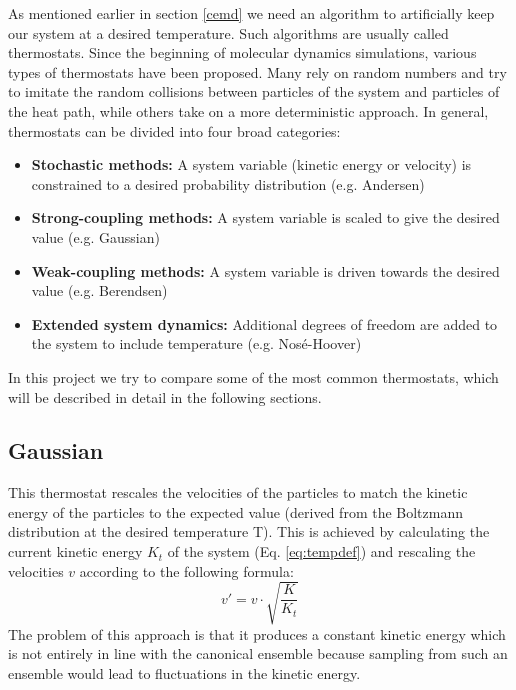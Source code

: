 As mentioned earlier in section \ref{cemd} we need an algorithm to artificially keep our system at a desired temperature. Such algorithms are usually called thermostats. Since the beginning of molecular dynamics simulations, various types of thermostats have been proposed. Many rely on random numbers and try to imitate the random collisions between particles of the system and particles of the heat path, while others take on a more deterministic approach. In general, thermostats can be divided into four broad categories: 
\begin{itemize}
\item \textbf{Stochastic methods:} A system variable (kinetic energy or velocity) is constrained to a desired probability distribution (e.g. Andersen)
\item \textbf{Strong-coupling methods:} A system variable is scaled to give the desired value (e.g. Gaussian) 
\item \textbf{Weak-coupling methods:} A system variable is driven towards the desired value (e.g. Berendsen) 
\item \textbf{Extended system dynamics:} Additional degrees of freedom are added to the system to include temperature (e.g. Nosé-Hoover) 
\end{itemize}  
In this project we try to compare some of the most common thermostats, which will be described in detail in the following sections. 

\subsection{Gaussian}\label{th:gaussian}
This thermostat rescales the velocities of the particles to match the kinetic energy of the particles to the expected value (derived from the Boltzmann distribution at the desired temperature T). This is achieved by calculating the current kinetic energy $K_t$ of the system (Eq. \eqref{eq:tempdef}) and rescaling the velocities $v$ according to the following formula:
\begin{equation}
v'  = v\cdot \sqrt{\frac{K}{K_t}}\label{eq:gauss}
\end{equation}
The problem of this approach is that it produces a constant kinetic energy which is not entirely in line with the canonical ensemble because sampling from such an ensemble would lead to fluctuations in the kinetic energy.

